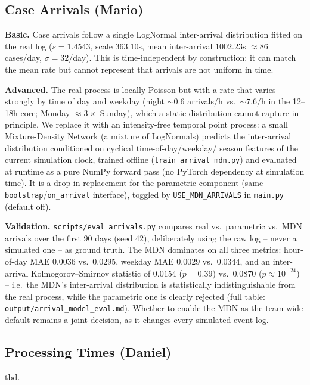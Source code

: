 \documentclass[
  english,        %
  font=times,     %
  twocolumn,      %
]{tumarticle}
\begin{document}
\subsection{Case Arrivals (Mario)}
\textbf{Basic.} Case arrivals follow a single LogNormal inter-arrival
distribution fitted on the real log ($s=1.4543$, scale $363.10$s, mean
inter-arrival $1002.23$s $\approx 86$ cases/day, $\sigma=32$/day). This is
time-independent by construction: it can match the mean rate but cannot
represent that arrivals are not uniform in time.

\textbf{Advanced.} The real process is locally Poisson but with a rate
that varies strongly by time of day and weekday (night $\sim\!0.6$
arrivals/h vs.\ $\sim\!7.6$/h in the 12--18h core; Monday
$\approx 3\times$ Sunday), which a static distribution cannot capture in
principle. We replace it with an intensity-free temporal point process: a
small Mixture-Density Network (a mixture of LogNormals) predicts the
inter-arrival distribution conditioned on cyclical time-of-day/weekday/
season features of the current simulation clock, trained offline
(\texttt{train\_arrival\_mdn.py}) and evaluated at runtime as a pure
NumPy forward pass (no PyTorch dependency at simulation time). It is a
drop-in replacement for the parametric component (same
\texttt{bootstrap}/\texttt{on\_arrival} interface), toggled by
\texttt{USE\_MDN\_ARRIVALS} in \texttt{main.py} (default off).

\textbf{Validation.} \texttt{scripts/eval\_arrivals.py} compares real vs.\
parametric vs.\ MDN arrivals over the first 90 days (seed 42), deliberately
using the raw log -- never a simulated one -- as ground truth. The MDN
dominates on all three metrics: hour-of-day MAE $0.0036$ vs.\ $0.0295$,
weekday MAE $0.0029$ vs.\ $0.0344$, and an inter-arrival
Kolmogorov--Smirnov statistic of $0.0154$ ($p = 0.39$) vs.\ $0.0870$
($p \approx 10^{-24}$) -- i.e.\ the MDN's inter-arrival distribution is
statistically indistinguishable from the real process, while the
parametric one is clearly rejected (full table:
\texttt{output/arrival\_model\_eval.md}). Whether to enable the MDN as the
team-wide default remains a joint decision, as it changes every simulated
event log.

\subsection{Processing Times (Daniel)}
tbd.
\end{document}
